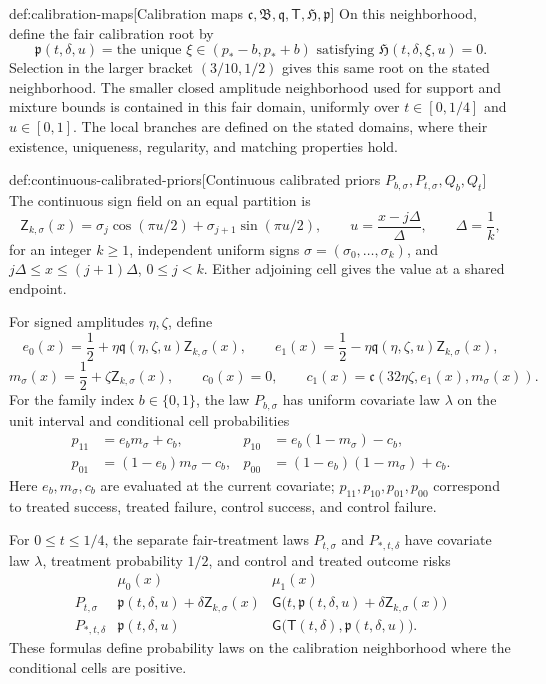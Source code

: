 \begin{definitionv}{def:calibration-maps}[Calibration maps $\mathfrak c,\mathfrak B,\mathfrak q,\mathsf T,\mathfrak H,\mathfrak p$]
On this neighborhood, define the fair calibration root by
\[
\mathfrak p(t,\delta,u)
=
\text{the unique }\xi\in(p_*-b,p_*+b)
\text{ satisfying }\mathfrak H(t,\delta,\xi,u)=0.
\]
Selection in the larger bracket \((3/10,1/2)\) gives this same root on the stated neighborhood. The smaller closed amplitude neighborhood used for support and mixture bounds is contained in this fair domain, uniformly over \(t\in[0,1/4]\) and \(u\in[0,1]\). The local branches are defined on the stated domains, where their existence, uniqueness, regularity, and matching properties hold.
\end{definitionv}

\begin{definitionv}{def:continuous-calibrated-priors}[Continuous calibrated priors \(P_{b,\sigma},P_{t,\sigma},Q_b,Q_t\)]
The continuous sign field on an equal partition is
\[
\mathsf Z_{k,\sigma}(x)
=
\sigma_j\cos(\pi u/2)+\sigma_{j+1}\sin(\pi u/2),
\qquad
u=\frac{x-j\Delta}{\Delta},
\qquad
\Delta=\frac1k,
\]
for an integer \(k\ge1\), independent uniform signs
\(\sigma=(\sigma_0,\ldots,\sigma_k)\), and
\(j\Delta\le x\le(j+1)\Delta\), \(0\le j<k\). Either adjoining cell gives the value at a shared endpoint.

For signed amplitudes \(\eta,\zeta\), define
\[
e_0(x)=\frac12+\eta\mathfrak q(\eta,\zeta,u)\mathsf Z_{k,\sigma}(x),
\qquad
e_1(x)=\frac12-\eta\mathfrak q(\eta,\zeta,u)\mathsf Z_{k,\sigma}(x),
\]
\[
m_\sigma(x)=\frac12+\zeta\mathsf Z_{k,\sigma}(x),
\qquad
c_0(x)=0,
\qquad
c_1(x)=\mathfrak c(32\eta\zeta,e_1(x),m_\sigma(x)).
\]
For the family index \(b\in\{0,1\}\), the law \(P_{b,\sigma}\) has uniform covariate law \(\lambda\) on the unit interval and conditional cell probabilities
\[
\begin{aligned}
p_{11}&=e_bm_\sigma+c_b,
&
p_{10}&=e_b(1-m_\sigma)-c_b,\\
p_{01}&=(1-e_b)m_\sigma-c_b,
&
p_{00}&=(1-e_b)(1-m_\sigma)+c_b.
\end{aligned}
\]
Here \(e_b,m_\sigma,c_b\) are evaluated at the current covariate; \(p_{11},p_{10},p_{01},p_{00}\) correspond to treated success, treated failure, control success, and control failure.

For \(0\le t\le1/4\), the separate fair-treatment laws \(P_{t,\sigma}\) and \(P_{*,t,\delta}\) have covariate law \(\lambda\), treatment probability \(1/2\), and control and treated outcome risks
\[
\begin{array}{c|cc}
&\mu_0(x)&\mu_1(x)\\ \hline
P_{t,\sigma}
&
\mathfrak p(t,\delta,u)+\delta\mathsf Z_{k,\sigma}(x)
&
\mathsf G\bigl(t,\mathfrak p(t,\delta,u)+\delta\mathsf Z_{k,\sigma}(x)\bigr)
\\
P_{*,t,\delta}
&
\mathfrak p(t,\delta,u)
&
\mathsf G\bigl(\mathsf T(t,\delta),\mathfrak p(t,\delta,u)\bigr).
\end{array}
\]
These formulas define probability laws on the calibration neighborhood where the conditional cells are positive.


\end{definitionv}
